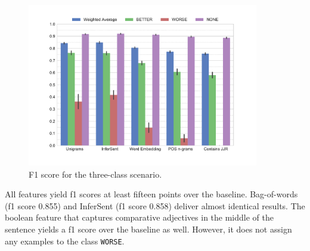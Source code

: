 \begin{figure}[h]
      \caption{F1 score for the three-class scenario.} 
    \label{fig:3_f1}
 \centering
	\includegraphics[width=0.9\textwidth]{images/experiments/f1-False}

\end{figure}

All features yield f1 scores at least fifteen points over the baseline. Bag-of-words (f1 score 0.855) and InferSent (f1 score 0.858) deliver almost identical results. The boolean feature that captures comparative adjectives in the middle of the sentence yields a f1 score over the baseline as well. However, it does not assign any examples to the class \texttt{WORSE}.



